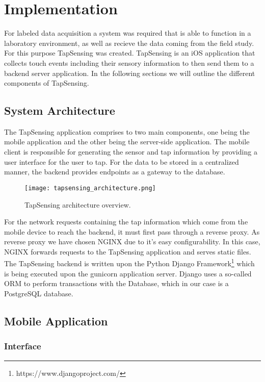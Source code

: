 \chapter{Implementation\label{cha:chapter3}}
For labeled data acquisition a system was required that is able to function in a laboratory environment, as well as recieve the data coming from the field study. For this purpose TapSensing was created. TapSensing is an iOS application that collects touch events including their sensory information to then send them to a backend server application. In the following sections we will outline the different components of TapSensing. 

\section{System Architecture}
The TapSensing application comprises to two main components, one being the mobile application and the other being the server-side application. The mobile client is responsible for generating the sensor and tap information by providing a user interface for the user to tap. For the data to be stored in a centralized manner, the backend provides endpoints as a gateway to the database.

\begin{figure}[h!]
  \centering
  \texttt{[image: tapsensing\_architecture.png]}
  \caption{TapSensing architecture overview.}
\end{figure}

For the network requests containing the tap information which come from the mobile device to reach the backend, it must first pass through a reverse proxy. As reverse proxy we have chosen NGINX due to it's easy configurability. In this case, NGINX forwards requests to the TapSensing application and serves static files.\\
The TapSensing backend is written upon the Python Django Framework\footnote{https://www.djangoproject.com/} which is being executed upon the gunicorn application server. Django uses a so-called ORM to perform transactions with the Database, which in our case is a PostgreSQL database.

\section{Mobile Application}
\subsection{Interface}
